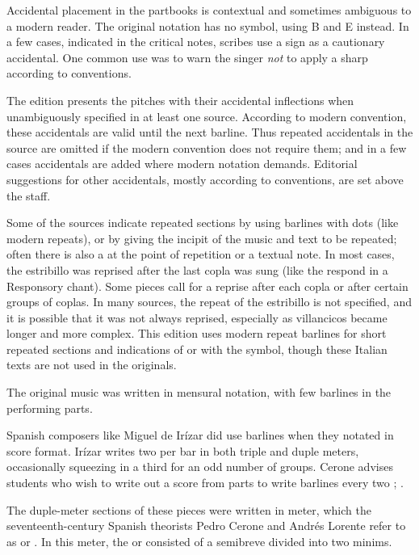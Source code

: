 Accidental placement in the partbooks is contextual and sometimes ambiguous to 
a modern reader.
The original notation has no \na{} symbol, using B\sh{} and E\sh{} instead.
In a few cases, indicated in the critical notes, scribes use a \sh{} sign as a 
cautionary accidental.
One common use was to warn the singer \emph{not} to apply a sharp according 
to  conventions.%
  \autocites{Harran:Cautionary1}{Harran:Cautionary2}

The edition presents the pitches with their accidental inflections when 
unambiguously specified in at least one source.
According to modern convention, these accidentals are valid until the next 
barline.
Thus repeated accidentals in the source are omitted if the modern convention 
does not require them; and in a few cases accidentals are added where modern 
notation demands.
Editorial suggestions for other accidentals, mostly according to  conventions, are set above the staff.

Some of the sources indicate repeated sections by using barlines with dots (like
modern repeats), or by giving the incipit of the music and text to be repeated;
often there is also a  at the point of repetition or a
textual note.
In most cases, the estribillo was reprised after the last copla was sung (like
the respond in a Responsory chant).
Some pieces call for a reprise after each copla or after certain groups of
coplas.
In many sources, the repeat of the estribillo is not specified, and it is
possible that it was not always reprised, especially as villancicos became
longer and more complex.%
    \Autocite{Torrente:Estribillo}
This edition uses modern repeat barlines for short repeated sections and
indications of  or  with the
\musSegno{} symbol, though these Italian texts are not used in the originals.

The original music was written in mensural notation, with few barlines in the 
performing parts.%
\begin{Footnote}
    Spanish composers like Miguel de Irízar did use barlines when they notated in 
    score format.
    Irízar writes two  per bar in both triple and duple meters,
    occasionally squeezing in a third  for an odd number
    of groups.
    Cerone advises students who wish to write out a score from parts to write 
    barlines every two ; \textcite[745]{Cerone:Melopeo}.
\end{Footnote}
The duple-meter sections of these pieces were written in \meterC{} meter, which
the seventeenth-century Spanish theorists Pedro Cerone and Andrés Lorente refer
to as  or .%
  \Autocites[537]{Cerone:Melopeo}[156, 210]{Lorente:Porque}
In this meter, the  or  consisted of a semibreve 
divided into two minims.%
  \Autocites{GonzalezValle:MusicaTexto}{GonzalezValle:CompasCabezon}

